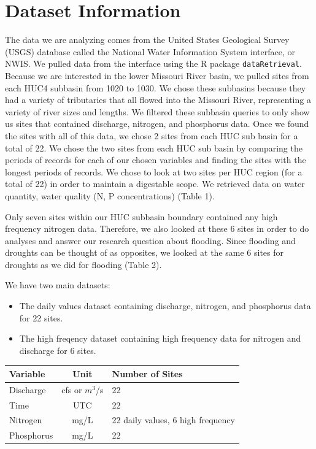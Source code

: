 \documentclass[12pt,]{article}
\begin{document}
\newpage

\hypertarget{dataset-information}{%
\section{Dataset Information}\label{dataset-information}}

The data we are analyzing comes from the United States Geological Survey
(USGS) database called the National Water Information System interface,
or NWIS. We pulled data from the interface using the R package
\texttt{dataRetrieval}. Because we are interested in the lower Missouri
River basin, we pulled sites from each HUC4 subbasin from 1020 to 1030.
We chose these subbasins because they had a variety of tributaries that
all flowed into the Missouri River, representing a variety of river
sizes and lengths. We filtered these subbasin queries to only show us
sites that contained discharge, nitrogen, and phosphorus data. Once we
found the sites with all of this data, we chose 2 sites from each HUC
sub basin for a total of 22. We chose the two sites from each HUC sub
basin by comparing the periods of records for each of our chosen
variables and finding the sites with the longest periods of records. We
chose to look at two sites per HUC region (for a total of 22) in order
to maintain a digestable scope. We retrieved data on water quantity,
water quality (N, P concentrations) (Table 1).

Only seven sites within our HUC subbasin boundary contained any high
frequency nitrogen data. Therefore, we also looked at these 6 sites in
order to do analyses and answer our research question about flooding.
Since flooding and droughts can be thought of as opposites, we looked at
the same 6 sites for droughts as we did for flooding (Table 2).

We have two main datasets:

\begin{itemize}
\item
  The daily values dataset containing discharge, nitrogen, and
  phosphorus data for 22 sites.
\item
  The high freqency dataset containing high frequency data for nitrogen
  and discharge for 6 sites.
\end{itemize}

\begin{longtable}[]{@{}lcl@{}}
\toprule
Variable & Unit & Number of Sites\tabularnewline
\midrule
\endhead
Discharge & cfs or \(m^{3}\)/s & 22\tabularnewline
Time & UTC & 22\tabularnewline
Nitrogen & mg/L & 22 daily values, 6 high frequency\tabularnewline
Phosphorus & mg/L & 22\tabularnewline
\bottomrule
\end{longtable}
\end{document}
